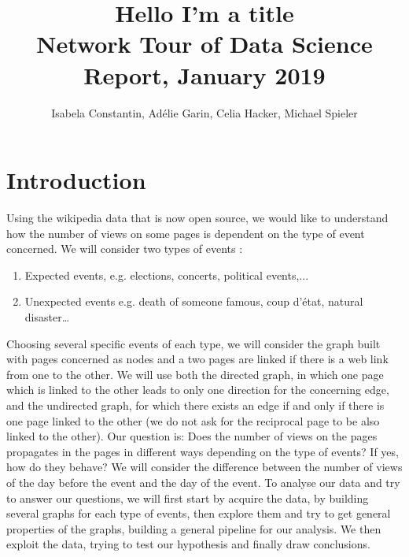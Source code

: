 \documentclass[conference]{IEEEtran}
\begin{document}
\title{Hello I'm a title\\
{\footnotesize Network Tour of Data Science Report, January 2019}
}

\author{Isabela Constantin, Ad\'elie Garin, Celia Hacker, Michael Spieler}

\maketitle

\section{Introduction}
Using the wikipedia data that is now open source, we would like to understand how the number of views on some pages is dependent on the type of event concerned. We will consider two types of events :
\begin{enumerate}
\item Expected events, e.g. elections, concerts, political events,...
\item Unexpected events e.g. death of someone famous, coup d’état, natural disaster…
\end{enumerate} 



Choosing several specific events of each type, we will consider the graph built with pages concerned as nodes and a two pages are linked if there is a web link from one to the other. We will use both the directed graph, in which one page which is linked to the other leads to only one direction for the concerning edge, and the undirected graph, for which there exists an edge if and only if there is one page linked to the other (we do not ask for the reciprocal page to be also linked to the other). 
\medskip
Our question is: Does the number of views on the pages propagates in the pages in different ways depending on the type of events? If yes, how do they behave?
\medskip
We will consider the difference between the number of views of the day before the event and the day of the event. 
\medskip
To analyse our data and try to answer our questions, we will first start by acquire the data, by building several graphs for each type of events, then explore them and try to get general properties of the graphs, building a general pipeline for our analysis. We then exploit the data, trying to test our hypothesis and finally draw conclusions. 
\end{document}
